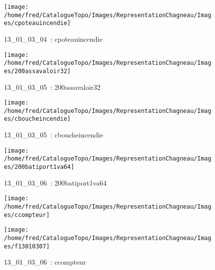 \documentclass[12pt,titlepage]{book}
\begin{document}
\begin{figure}[h!]
\begin{minipage}[t]{3cm}
\begin{center}
      \texttt{[image: /home/fred/CatalogueTopo/Images/RepresentationChagneau/Images/cpoteauincendie]}
      \caption[~13\_01\_03\_04]{\small{13\_01\_03\_04~:} \tiny{cpoteauincendie}}\label{cpoteauincendie}
    \end{center}
  \end{minipage}
  \begin{minipage}[t]{3cm}
    \begin{center}
      \texttt{[image: /home/fred/CatalogueTopo/Images/RepresentationChagneau/Images/200assavaloir32]}
      \caption[~13\_01\_03\_05]{\small{13\_01\_03\_05~:} \tiny{200assavaloir32}}\label{200assavaloir32}
    \end{center}
  \end{minipage}
  \begin{minipage}[t]{3cm}
    \begin{center}
      \texttt{[image: /home/fred/CatalogueTopo/Images/RepresentationChagneau/Images/cboucheincendie]}
      \caption[~13\_01\_03\_05]{\small{13\_01\_03\_05~:} \tiny{cboucheincendie}}\label{cboucheincendie}
    \end{center}
  \end{minipage}
  \begin{minipage}[t]{3cm}
    \begin{center}
      \texttt{[image: /home/fred/CatalogueTopo/Images/RepresentationChagneau/Images/200batiport1va64]}
      \caption[~13\_01\_03\_06]{\small{13\_01\_03\_06~:} \tiny{200batiport1va64}}\label{200batiport1va64}
    \end{center}
  \end{minipage}
  \begin{minipage}[t]{3cm}
    \begin{center}
      \texttt{[image: /home/fred/CatalogueTopo/Images/RepresentationChagneau/Images/ccompteur]}
      \caption[~13\_01\_03\_06]{\small{13\_01\_03\_06~:} \tiny{ccompteur}}\label{ccompteur}
    \end{center}
  \end{minipage}
  \begin{minipage}[t]{3cm}
    \begin{center}
      \texttt{[image: /home/fred/CatalogueTopo/Images/RepresentationChagneau/Images/f13010307]}

\end{center}
\end{minipage}
\end{figure}
\end{document}
